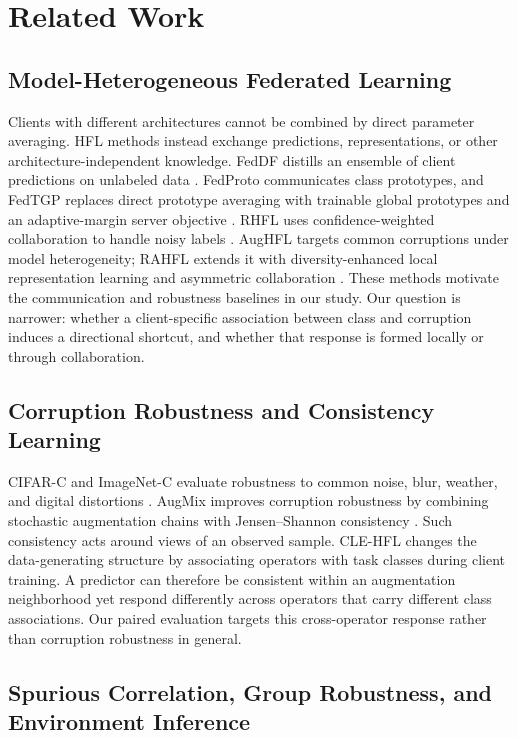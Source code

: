 \section{Related Work}

\subsection{Model-Heterogeneous Federated Learning}

Clients with different architectures cannot be combined by direct parameter averaging. HFL methods instead exchange predictions, representations, or other architecture-independent knowledge. FedDF distills an ensemble of client predictions on unlabeled data \citep{lin2020feddf}. FedProto communicates class prototypes, and FedTGP replaces direct prototype averaging with trainable global prototypes and an adaptive-margin server objective \citep{tan2022fedproto,zhang2024fedtgp}. RHFL uses confidence-weighted collaboration to handle noisy labels \citep{fang2022rhfl}. AugHFL targets common corruptions under model heterogeneity; RAHFL extends it with diversity-enhanced local representation learning and asymmetric collaboration \citep{fang2023aughfl,fang2025rahfl}. These methods motivate the communication and robustness baselines in our study. Our question is narrower: whether a client-specific association between class and corruption induces a directional shortcut, and whether that response is formed locally or through collaboration.

\subsection{Corruption Robustness and Consistency Learning}

CIFAR-C and ImageNet-C evaluate robustness to common noise, blur, weather, and digital distortions \citep{hendrycks2019corruptions}. AugMix improves corruption robustness by combining stochastic augmentation chains with Jensen--Shannon consistency \citep{cubuk2020augmix}. Such consistency acts around views of an observed sample. CLE-HFL changes the data-generating structure by associating operators with task classes during client training. A predictor can therefore be consistent within an augmentation neighborhood yet respond differently across operators that carry different class associations. Our paired evaluation targets this cross-operator response rather than corruption robustness in general.

\subsection{Spurious Correlation, Group Robustness, and Environment Inference}

